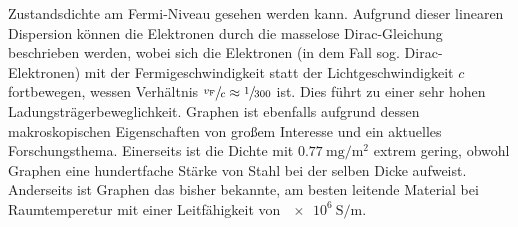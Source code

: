 Zustandsdichte am Fermi-Niveau gesehen werden kann.\cite{10.1093/nsr/nwu080}
Aufgrund dieser linearen Dispersion können die Elektronen durch die masselose Dirac-Gleichung beschrieben werden, wobei sich 
die Elektronen (in dem Fall sog. Dirac-Elektronen) mit der Fermigeschwindigkeit statt der Lichtgeschwindigkeit $c$ fortbewegen,
wessen Verhältnis $\sfrac{v_\text{F}}{c} \approx \sfrac{1}{300}$ ist.\cite{Avouris2007}
Dies führt zu einer sehr hohen Ladungsträgerbeweglichkeit.\cite{https://doi.org/10.1002/adma.201201482}
Graphen ist ebenfalls aufgrund dessen makroskopischen Eigenschaften von großem Interesse und ein aktuelles Forschungsthema.
Einerseits ist die  Dichte mit $\qty{0.77}{\milli\gram\per\metre\squared}$ extrem gering, obwohl 
Graphen eine hundertfache Stärke von Stahl bei der selben Dicke aufweist.\cite{graphene_properties} 
Anderseits ist Graphen das bisher bekannte, am besten leitende Material bei Raumtemperetur mit einer Leitfähigkeit von 
$\qty{e6}{\siemens\per\metre}$.\cite{graphene_properties}